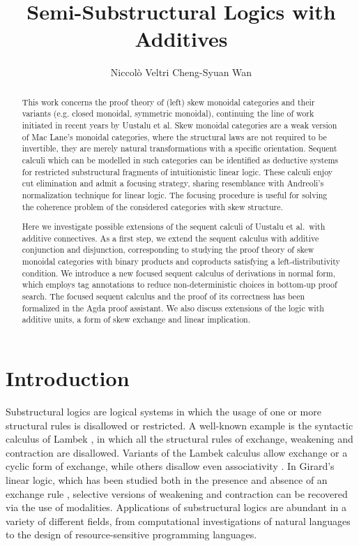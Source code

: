 \documentclass[submission,copyright,creativecommons]{eptcs}
\title{Semi-Substructural Logics with Additives}
\author{
Niccol{\`o} Veltri \qquad\qquad Cheng-Syuan Wan
\institute{Tallinn University of Technology, Estonia}
\email{\quad niccolo@cs.ioc.ee \quad\qquad cswan@cs.ioc.ee}
}
\theoremstyle{definition}
\begin{document}
\maketitle
\begin{abstract}
This work concerns the proof theory of (left) skew monoidal categories and their variants (e.g. closed monoidal, symmetric monoidal), continuing the line of work initiated in recent years by Uustalu et al.
Skew monoidal categories are a weak version of Mac Lane's monoidal categories, where the structural laws are not required to be invertible, they are merely natural transformations with a specific orientation. 
Sequent calculi which can be modelled in such categories can be identified as deductive systems for restricted substructural fragments of intuitionistic linear logic. These calculi enjoy cut elimination and admit a focusing strategy, sharing resemblance with Andreoli's normalization technique for linear logic. The focusing procedure is useful for solving the coherence problem of the considered categories with skew structure.

Here we investigate possible extensions of the sequent calculi of Uustalu et al.~with additive connectives. 
As a first step, we extend the sequent calculus with additive conjunction and disjunction, corresponding to studying the proof theory of skew monoidal categories with binary products and coproducts satisfying a left-distributivity condition. 
We introduce a new focused sequent calculus of derivations in normal form, which employs tag annotations to reduce non-deterministic choices in bottom-up proof search.
The focused sequent calculus and the proof of its correctness has been formalized in the Agda proof assistant.
We also discuss extensions of the logic with additive units, a form of skew exchange and linear implication.
\end{abstract}

\section{Introduction}

Substructural logics are logical systems in which the usage of one or more structural rules is disallowed or restricted. A well-known example is the syntactic calculus of Lambek \cite{lambek:mathematics:58}, in which all the structural rules of exchange, weakening and contraction are disallowed. Variants of the Lambek calculus allow exchange or a cyclic form of exchange, while others disallow even associativity \cite{moot:logic:12}. In Girard's linear logic, which has been studied both in the presence and absence of an exchange rule \cite{girard:linear:87,abrusci:noncommutative:1990}, selective versions of weakening and contraction can be recovered via the use of modalities. Applications of substructural logics are abundant in a variety of different fields, from computational investigations of natural languages to the design of resource-sensitive programming languages.
\end{document}
